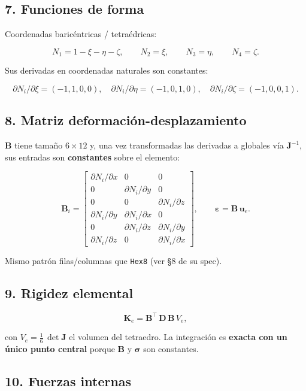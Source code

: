 \documentclass[11pt,letterpaper,oneside]{report}
\begin{document}
\subsection{7. Funciones de forma}

Coordenadas baricéntricas / tetraédricas:

\[
N_1 = 1 - \xi - \eta - \zeta, \qquad N_2 = \xi, \qquad N_3 = \eta, \qquad N_4 = \zeta.
\]

Sus derivadas en coordenadas naturales son constantes:

\[
\partial N_i / \partial \xi = (-1, 1, 0, 0),\quad \partial N_i / \partial \eta = (-1, 0, 1, 0),\quad \partial N_i / \partial \zeta = (-1, 0, 0, 1).
\]

\subsection{8. Matriz deformación-desplazamiento}

$\mathbf B$ tiene tamaño $6 \times 12$ y, una vez transformadas las derivadas a globales vía $\mathbf J^{-1}$, sus entradas son \textbf{constantes} sobre el elemento:

\[
\mathbf B_i = \begin{bmatrix}
\partial N_i / \partial x & 0 & 0 \\
0 & \partial N_i / \partial y & 0 \\
0 & 0 & \partial N_i / \partial z \\
\partial N_i / \partial y & \partial N_i / \partial x & 0 \\
0 & \partial N_i / \partial z & \partial N_i / \partial y \\
\partial N_i / \partial z & 0 & \partial N_i / \partial x
\end{bmatrix}, \qquad \boldsymbol\varepsilon = \mathbf B\,\mathbf u_e.
\]

Mismo patrón filas/columnas que \texttt{Hex8} (ver §8 de su spec).

\subsection{9. Rigidez elemental}

\[
\mathbf K_e = \mathbf B^\top\,\mathbf D\,\mathbf B\, V_e,
\]

con $V_e = \tfrac{1}{6}\,\det\mathbf J$ el volumen del tetraedro. La integración es \textbf{exacta con un único punto central} porque $\mathbf B$ y $\boldsymbol\sigma$ son constantes.

\subsection{10. Fuerzas internas}
\end{document}

